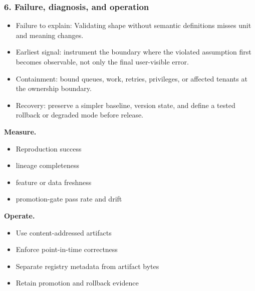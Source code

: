 \subsubsection*{6. Failure, diagnosis, and operation}
\begin{itemize}
\item Failure to explain: Validating shape without semantic definitions misses unit and meaning changes.
\item Earliest signal: instrument the boundary where the violated assumption first becomes observable, not only the final user-visible error.
\item Containment: bound queues, work, retries, privileges, or affected tenants at the ownership boundary.
\item Recovery: preserve a simpler baseline, version state, and define a tested rollback or degraded mode before release.
\end{itemize}
\textbf{Measure.}\begin{itemize}
\item Reproduction success
\item lineage completeness
\item feature or data freshness
\item promotion-gate pass rate and drift
\end{itemize}
\textbf{Operate.}\begin{itemize}
\item Use content-addressed artifacts
\item Enforce point-in-time correctness
\item Separate registry metadata from artifact bytes
\item Retain promotion and rollback evidence
\end{itemize}
